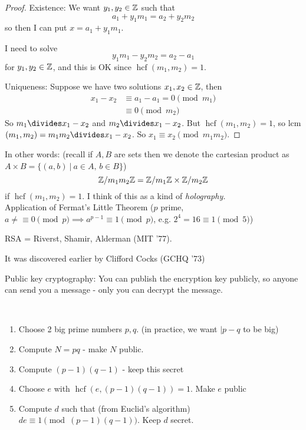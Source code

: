 \documentclass[twoside]{scrartcl}
\DeclareMathOperator{\hcf}{hcf}
\begin{document}
\begin{proof}
Existence: We want $y_1,y_2 \in\mathbb{Z}$ such that
\[a_1 + y_1 m_1 = a_2 + y_2m_2\]
so then I can put $x = a_1+y_1m_1$. 

I need to solve
\[y_1 m_1 - y_2m_2 = a_2 - a_1\]
for $y_1,y_2 \in\mathbb{Z}$, and this is OK since $\hcf(m_1,m_2) = 1$. 

Uniqueness: Suppose we have two solutions $x_1,x_2 \in\mathbb{Z}$, then 
\[
\begin{aligned}
  x_1 - x_2 &\equiv a_1 - a_1 = 0 \pmod{m_1}\\
  &\equiv  0 \pmod{m_2}
\end{aligned}
\]
So $m_1 \divides x_1 - x_2$ and $m_2 \divides x_1 - x_2$. But $\hcf(m_1,m_2) = 1$, so lcm$(m_1,m_2) = m_1m_2 \divides x_1 - x_2$. So $x_1 \equiv x_2 \pmod{m_1m_2}$. 
\end{proof}



In other words: (recall if $A,B$ are sets then we denote the cartesian product as $A \times B = \{(a,b) ~|~ a \in A,\, b \in B\}$)
\[\mathbb{Z} / m_1m_2\mathbb{Z} = \mathbb{Z}/ m_1\mathbb{Z} \times \mathbb{Z} / m_2\mathbb{Z}  \]
if $\hcf(m_1,m_2) = 1$. I think of this as a kind of \emph{holography.}\\



Application of 
Fermat's Little Theorem ($p$ prime, $a \neq \equiv 0 \pmod{p} \implies a^{p-1} \equiv 1 \pmod{p}$, e.g. $2^4 = 16 \equiv 1 \pmod{5}$)

RSA = Riverst, Shamir, Alderman (MIT '77). 

It was discovered earlier by Clifford Cocks (GCHQ '73)

Public key cryptography: You can publish the encryption key publicly, so anyone can send you a message - only you can decrypt the message. 


\begin{proc}~\\
\begin{enumerate}
\item Choose 2 big prime numbers $p,q$. (in practice, we want $|p-q$ to be big)
\item Compute $N = pq$ - make $N$ public. 
\item Compute $(p-1)(q-1)$ - keep this secret
\item Choose $e$ with $\hcf(e,(p-1)(q-1)) = 1$. Make $e$ public
\item Compute $d$ such that (from Euclid's algorithm) $de \equiv 1 \pmod{(p-1)(q-1)}$. Keep $d$ secret. 
\end{enumerate}	
\end{proc}
\end{document}
